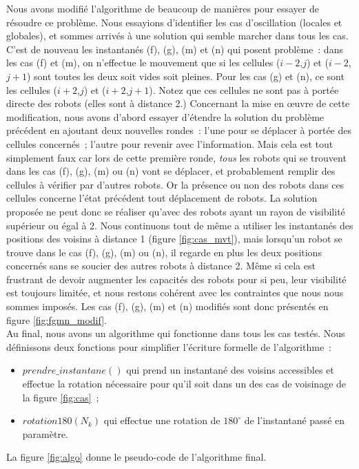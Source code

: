 Nous avons modifié l'algorithme de beaucoup de manières pour essayer de
résoudre ce problème. Nous essayions d'identifier les cas d'oscillation
(locales et globales), et sommes arrivés à une solution qui semble marcher dans
tous les cas. C'est de nouveau les instantanés (f), (g), (m) et (n) qui posent
problème~: dans les cas (f) et (m), on n'effectue le mouvement que si les
cellules ($i-2$,$j$) et ($i-2$,$j+1$) sont toutes les deux soit vides soit
pleines. Pour les cas (g) et (n), ce sont les cellules ($i+2$,$j$) et
($i+2$,$j+1$). Notez que ces cellules ne sont pas à portée directe des robots
(elles sont à distance 2.) Concernant la mise en \oe{}uvre de cette
modification, nous avons d'abord essayer d'étendre la solution du problème
précédent en ajoutant deux nouvelles rondes~: l'une pour se déplacer à portée
des cellules concernés~; l'autre pour revenir avec l'information. Mais cela est
tout simplement faux car lors de cette première ronde, \emph{tous} les robots
qui se trouvent dans les cas (f), (g), (m) ou (n) vont se déplacer, et
probablement remplir des cellules à vérifier par d'autres robots. Or la
présence ou non des robots dans ces cellules concerne l'état précédent tout
déplacement de robots. La solution proposée ne peut donc se réaliser qu'avec
des robots ayant un rayon de visibilité supérieur ou égal à 2. Nous continuons
tout de même a utiliser les instantanés des positions des voisins à distance 1
(figure \ref{fig:cas_mvt}), mais lorsqu'un robot se trouve dans le cas (f),
(g), (m) ou (n), il regarde en plus les deux positions concernés sans se
soucier des autres robots à distance 2. Même si cela est frustrant de devoir
augmenter les capacités des robots pour si peu, leur visibilité est toujours
limitée, et nous restons cohérent avec les contraintes que nous nous sommes
imposés. Les cas (f), (g), (m) et (n) modifiés sont donc présentés en figure
\ref{fig:fgmn_modif}. \\



Au final, nous avons un algorithme qui fonctionne dans tous les cas testés.
Nous définissons deux fonctions pour simplifier l'écriture formelle de
l'algorithme~:
\begin{itemize}
  \item $prendre\_instantane()$ qui prend un instantané des voisins accessibles
  et effectue la rotation nécessaire pour qu'il soit dans un des cas de
  voisinage de la figure \ref{fig:cas}~;
  \item $rotation180(N_k)$ qui effectue une rotation de $180^\circ{}$ de
  l'instantané passé en paramètre.
\end{itemize}
La figure \ref{fig:algo} donne le pseudo-code de l'algorithme final. \\

